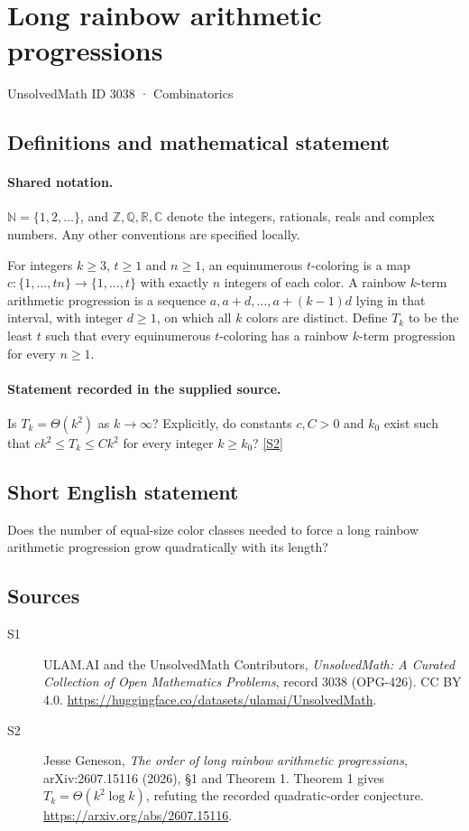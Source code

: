 \documentclass[11pt]{article}
\newcommand{\sref}[2]{\hyperlink{source:#1:#2}{[S#2]}}
\begin{document}
\setcounter{section}{3037}
\section{Long rainbow arithmetic progressions}\label{3038}
{\small\sffamily UnsolvedMath ID 3038 · Combinatorics}
\subsection{Definitions and mathematical statement}

\paragraph{Shared notation.}$\mathbb N=\{1,2,\ldots\}$, and $\mathbb Z,\mathbb Q,\mathbb R,\mathbb C$ denote the integers, rationals, reals and complex numbers. Any other conventions are specified locally.


For integers $k\geq3$, $t\geq1$ and $n\geq1$, an equinumerous $t$-coloring is a map $c:\{1,\ldots,tn\}\to\{1,\ldots,t\}$ with exactly $n$ integers of each color. A rainbow $k$-term arithmetic progression is a sequence $a,a+d,\ldots,a+(k-1)d$ lying in that interval, with integer $d\geq1$, on which all $k$ colors are distinct. Define $T_k$ to be the least $t$ such that every equinumerous $t$-coloring has a rainbow $k$-term progression for every $n\geq1$.
\paragraph{Statement recorded in the supplied source.}
Is $T_k=\Theta(k^2)$ as $k\to\infty$? Explicitly, do constants $c,C>0$ and $k_0$ exist such that $ck^2\leq T_k\leq Ck^2$ for every integer $k\geq k_0$? \sref{3038}{2}
\subsection{Short English statement}
Does the number of equal-size color classes needed to force a long rainbow arithmetic progression grow quadratically with its length?
\subsection{Sources}
\begin{description}
\item[\hypertarget{source:3038:1}{S1}] ULAM.AI and the UnsolvedMath Contributors, \emph{UnsolvedMath: A Curated Collection of Open Mathematics Problems}, record 3038 (OPG-426). CC BY 4.0. \url{https://huggingface.co/datasets/ulamai/UnsolvedMath}.
\item[\hypertarget{source:3038:2}{S2}] Jesse Geneson, \emph{The order of long rainbow arithmetic progressions}, arXiv:2607.15116 (2026), §1 and Theorem 1. Theorem 1 gives $T_k=\Theta(k^2\log k)$, refuting the recorded quadratic-order conjecture. \url{https://arxiv.org/abs/2607.15116}.
\end{description}
\label{end:3038}
\end{document}
